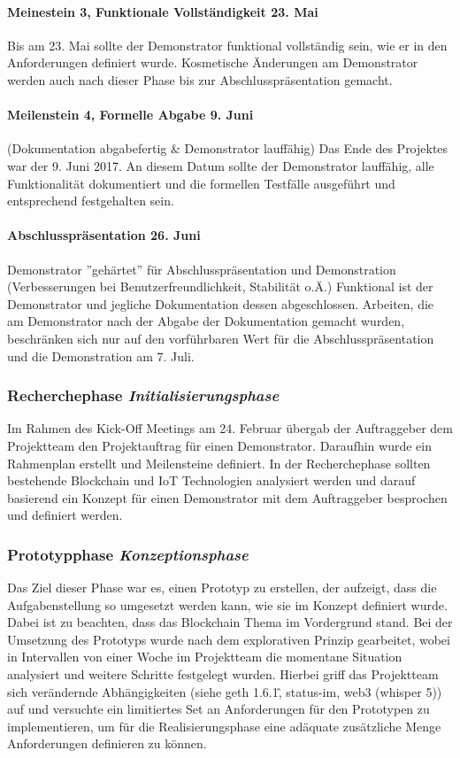 \paragraph{Meinestein 3, Funktionale Vollständigkeit 23. Mai}
Bis am 23. Mai sollte der Demonstrator funktional vollständig sein, wie er in den Anforderungen definiert wurde. Kosmetische Änderungen am Demonstrator werden auch nach dieser Phase bis zur Abschlusspräsentation gemacht.

\paragraph{Meilenstein 4, Formelle Abgabe 9. Juni}
(Dokumentation abgabefertig \& Demonstrator lauffähig) Das Ende des Projektes war der 9. Juni 2017. An diesem Datum sollte der Demonstrator lauffähig, alle Funktionalität dokumentiert und die formellen Testfälle ausgeführt und entsprechend festgehalten sein. 

\paragraph{Abschlusspräsentation 26. Juni}
Demonstrator ''gehärtet'' für Abschlusspräsentation und Demonstration (Verbesserungen bei Benutzerfreundlichkeit, Stabilität o.Ä.)
Funktional ist der Demonstrator und jegliche Dokumentation dessen abgeschlossen. Arbeiten, die am Demonstrator nach der Abgabe der Dokumentation gemacht wurden, beschränken sich nur auf den vorführbaren Wert für die Abschlusspräsentation und die Demonstration am 7. Juli.

\subsubsection{Recherchephase \emph{Initialisierungsphase}}
\label{pm_subsubsec:Recherchephase}
Im Rahmen des Kick-Off Meetings am 24. Februar übergab der Auftraggeber dem Projektteam den Projektauftrag für einen Demonstrator. Daraufhin wurde ein Rahmenplan erstellt und Meilensteine definiert. In der Recherchephase sollten bestehende Blockchain und IoT Technologien analysiert werden und darauf basierend ein Konzept für einen Demonstrator mit dem Auftraggeber besprochen und definiert werden.

\subsubsection{Prototypphase \emph{Konzeptionsphase}}
\label{pm_subsubsec:Prototypphase}
Das Ziel dieser Phase war es, einen Prototyp zu erstellen, der aufzeigt, dass die Aufgabenstellung so umgesetzt werden kann, wie sie im Konzept definiert wurde. Dabei ist zu beachten, dass das Blockchain Thema im Vordergrund stand. Bei der Umsetzung des Prototyps wurde nach dem explorativen Prinzip gearbeitet, wobei in Intervallen von einer Woche im Projektteam die momentane Situation analysiert und weitere Schritte festgelegt wurden. Hierbei griff das Projektteam sich verändernde Abhängigkeiten (siehe geth 1.6.1\^, status-im, web3 (whisper 5)) auf und versuchte ein limitiertes Set an Anforderungen für den Prototypen zu implementieren, um für die Realisierungsphase eine adäquate zusätzliche Menge Anforderungen definieren zu können.

